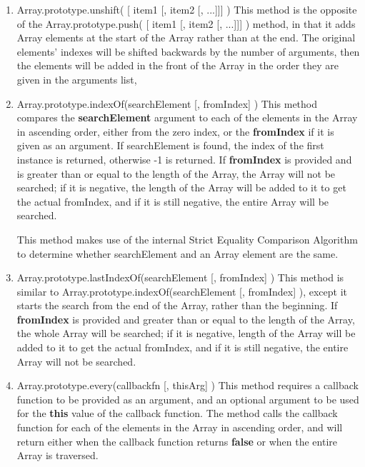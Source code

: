 \documentclass[a4paper,11pt,twoside]{report}
\begin{document}
\begin{enumerate}
\item Array.prototype.unshift( [ item1 [, item2 [, ...]]] ) \newline
This method is the opposite of the Array.prototype.push( [ item1 [, item2 [, ...]]] ) method, in that it adds Array elements at the start of the Array rather than at the end. The original elements' indexes will be shifted backwards by the number of arguments, then the elements will be added in the front of the Array in the order they are given in the arguments list, 

\item Array.prototype.indexOf(searchElement [, fromIndex] ) \newline
This method compares the \textbf{searchElement} argument to each of the elements in the Array in ascending order, either from the zero index, or the \textbf{fromIndex} if it is given as an argument. If searchElement is found, the index of the first instance is returned, otherwise -1 is returned. If \textbf{fromIndex} is provided and is greater than or equal to the length of the Array, the Array will not be searched; if it is negative, the length of the Array will be added to it to get the actual fromIndex, and if it is still negative, the entire Array will be searched.

This method makes use of the internal Strict Equality Comparison Algorithm to determine whether searchElement and an Array element are the same.

\item Array.prototype.lastIndexOf(searchElement [, fromIndex] ) \newline
This method is similar to Array.prototype.indexOf(searchElement [, fromIndex] ), except it starts the search from the end of the Array, rather than the beginning. If \textbf{fromIndex} is provided and greater than or equal to the length of the Array, the whole Array will be searched; if it is negative, length of the Array will be added to it to get the actual fromIndex, and if it is still negative, the entire Array will not be searched.

\item Array.prototype.every(callbackfn [, thisArg] ) \newline
This method requires a callback function to be provided as an argument, and an optional argument to be used for the \textbf{this} value of the callback function. The method calls the callback function for each of the elements in the Array in ascending order, and will return either when the callback function returns \textbf{false} or when the entire Array is traversed. 


\end{enumerate}
\end{document}
